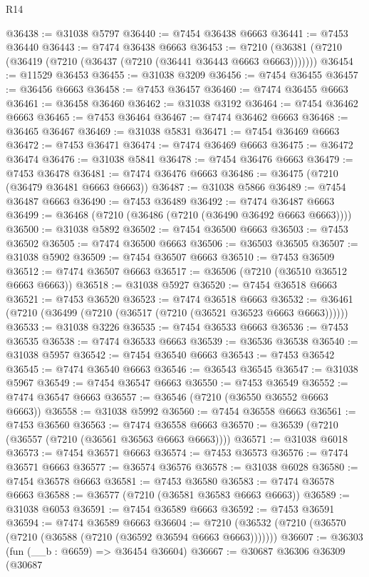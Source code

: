 \begin{lexlean}{R14}
\begin{coremodule}
@36438 := @31038 @5797
@36440 := @7454 @36438 @6663
@36441 := @7453 @36440
@36443 := @7474 @36438 @6663
@36453 := @7210 (@36381 (@7210 (@36419 (@7210 (@36437 (@7210 (@36441 @36443 @6663 @6663)))))))
@36454 := @11529 @36453
@36455 := @31038 @3209
@36456 := @7454 @36455
@36457 := @36456 @6663
@36458 := @7453 @36457
@36460 := @7474 @36455 @6663
@36461 := @36458 @36460
@36462 := @31038 @3192
@36464 := @7454 @36462 @6663
@36465 := @7453 @36464
@36467 := @7474 @36462 @6663
@36468 := @36465 @36467
@36469 := @31038 @5831
@36471 := @7454 @36469 @6663
@36472 := @7453 @36471
@36474 := @7474 @36469 @6663
@36475 := @36472 @36474
@36476 := @31038 @5841
@36478 := @7454 @36476 @6663
@36479 := @7453 @36478
@36481 := @7474 @36476 @6663
@36486 := @36475 (@7210 (@36479 @36481 @6663 @6663))
@36487 := @31038 @5866
@36489 := @7454 @36487 @6663
@36490 := @7453 @36489
@36492 := @7474 @36487 @6663
@36499 := @36468 (@7210 (@36486 (@7210 (@36490 @36492 @6663 @6663))))
@36500 := @31038 @5892
@36502 := @7454 @36500 @6663
@36503 := @7453 @36502
@36505 := @7474 @36500 @6663
@36506 := @36503 @36505
@36507 := @31038 @5902
@36509 := @7454 @36507 @6663
@36510 := @7453 @36509
@36512 := @7474 @36507 @6663
@36517 := @36506 (@7210 (@36510 @36512 @6663 @6663))
@36518 := @31038 @5927
@36520 := @7454 @36518 @6663
@36521 := @7453 @36520
@36523 := @7474 @36518 @6663
@36532 := @36461 (@7210 (@36499 (@7210 (@36517 (@7210 (@36521 @36523 @6663 @6663))))))
@36533 := @31038 @3226
@36535 := @7454 @36533 @6663
@36536 := @7453 @36535
@36538 := @7474 @36533 @6663
@36539 := @36536 @36538
@36540 := @31038 @5957
@36542 := @7454 @36540 @6663
@36543 := @7453 @36542
@36545 := @7474 @36540 @6663
@36546 := @36543 @36545
@36547 := @31038 @5967
@36549 := @7454 @36547 @6663
@36550 := @7453 @36549
@36552 := @7474 @36547 @6663
@36557 := @36546 (@7210 (@36550 @36552 @6663 @6663))
@36558 := @31038 @5992
@36560 := @7454 @36558 @6663
@36561 := @7453 @36560
@36563 := @7474 @36558 @6663
@36570 := @36539 (@7210 (@36557 (@7210 (@36561 @36563 @6663 @6663))))
@36571 := @31038 @6018
@36573 := @7454 @36571 @6663
@36574 := @7453 @36573
@36576 := @7474 @36571 @6663
@36577 := @36574 @36576
@36578 := @31038 @6028
@36580 := @7454 @36578 @6663
@36581 := @7453 @36580
@36583 := @7474 @36578 @6663
@36588 := @36577 (@7210 (@36581 @36583 @6663 @6663))
@36589 := @31038 @6053
@36591 := @7454 @36589 @6663
@36592 := @7453 @36591
@36594 := @7474 @36589 @6663
@36604 := @7210 (@36532 (@7210 (@36570 (@7210 (@36588 (@7210 (@36592 @36594 @6663 @6663)))))))
@36607 := @36303 (fun (__b : @6659) => @36454 @36604)
@36667 := @30687
    @36306
    @36309
    (@30687

\end{coremodule}
\end{lexlean}
